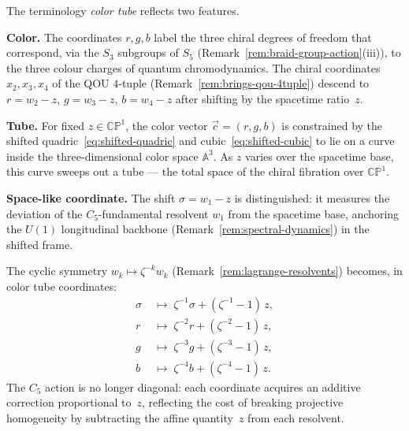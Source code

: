 \begin{remark}
\label{rem:color-tube-interpretation}
  The terminology \emph{color tube} reflects two features.

  \medskip
  \noindent\textbf{Color.}\;
  The coordinates $r, g, b$ label the three chiral degrees of freedom
  that correspond, via the $S_3$ subgroups of $S_5$
  (Remark~\ref{rem:braid-group-action}\textup{(iii)}), to the three
  colour charges of quantum chromodynamics.  The chiral coordinates
  $x_2, x_3, x_4$ of the QOU $4$-tuple
  (Remark~\ref{rem:brings-qou-4tuple}) descend to $r = w_2 - z$,
  $g = w_3 - z$, $b = w_4 - z$ after shifting by the spacetime ratio~$z$.

  \medskip
  \noindent\textbf{Tube.}\;
  For fixed $z \in \mathbb{CP}^1$, the color vector $\vec{c} = (r, g, b)$
  is constrained by the shifted quadric~\eqref{eq:shifted-quadric} and
  cubic~\eqref{eq:shifted-cubic} to lie on a curve inside the
  three-dimensional color space $\mathbb{A}^3$.  As $z$ varies over the
  spacetime base, this curve sweeps out a tube --- the total space of
  the chiral fibration over $\mathbb{CP}^1$.

  \medskip
  \noindent\textbf{Space-like coordinate.}\;
  The shift $\sigma = w_1 - z$ is distinguished: it measures the deviation
  of the $C_5$-fundamental resolvent $w_1$ from the spacetime base,
  anchoring the $U(1)$ longitudinal backbone
  (Remark~\ref{rem:spectral-dynamics}) in the shifted frame.
\end{remark}

\begin{remark}
\label{rem:c5-color-tube}
  The cyclic symmetry $w_k \mapsto \zeta^{-k} w_k$
  (Remark~\ref{rem:lagrange-resolvents}) becomes, in color tube coordinates:
  \begin{align}
    \sigma &\;\longmapsto\; \zeta^{-1}\sigma + (\zeta^{-1}-1)\,z,
      \label{eq:c5-sigma}\\[4pt]
    r &\;\longmapsto\; \zeta^{-2}r + (\zeta^{-2}-1)\,z,
      \label{eq:c5-r}\\[4pt]
    g &\;\longmapsto\; \zeta^{-3}g + (\zeta^{-3}-1)\,z,
      \label{eq:c5-g}\\[4pt]
    b &\;\longmapsto\; \zeta^{-4}b + (\zeta^{-4}-1)\,z.
      \label{eq:c5-b}
  \end{align}
  The $C_5$ action is no longer diagonal: each coordinate acquires an
  additive correction proportional to~$z$, reflecting the cost of
  breaking projective homogeneity by subtracting the affine
  quantity~$z$ from each resolvent.
\end{remark}


